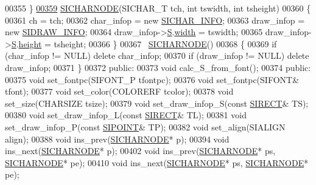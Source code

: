 \begin{DoxyCode}
00355     \}
\hyperlink{class_s_i_c_h_a_r_n_o_d_e_aa06366dc16bf0aab9d16aaf43be0f8a3}{00359}     \hyperlink{class_s_i_c_h_a_r_n_o_d_e_aa06366dc16bf0aab9d16aaf43be0f8a3}{SICHARNODE}(SICHAR\_T tch, \textcolor{keywordtype}{int} tswidth, \textcolor{keywordtype}{int} tsheight)   
00360     \{
00361         ch = tch;
00362         char\_infop = \textcolor{keyword}{new} \hyperlink{class_s_i_c_h_a_r___i_n_f_o}{SICHAR\_INFO};
00363         draw\_infop = \textcolor{keyword}{new} \hyperlink{class_s_i_d_r_a_w___i_n_f_o}{SIDRAW\_INFO};
00364         draw\_infop->\hyperlink{class_s_i_d_r_a_w___i_n_f_o_a495fac5bcc54e4b58d500a7117fde9d9}{S}.\hyperlink{struct_s_i_r_e_c_t_a99dbd77d045cc587f0c1f40bbba99ac8}{width} = tswidth;
00365         draw\_infop->\hyperlink{class_s_i_d_r_a_w___i_n_f_o_a495fac5bcc54e4b58d500a7117fde9d9}{S}.\hyperlink{struct_s_i_r_e_c_t_a6577f3092897d4bef17aab5ec4d62819}{height} = tsheight;
00366     \}
00367     ~\hyperlink{class_s_i_c_h_a_r_n_o_d_e}{SICHARNODE}() 
00368     \{
00369         \textcolor{keywordflow}{if} (char\_infop != NULL) \textcolor{keyword}{delete} char\_infop;
00370         \textcolor{keywordflow}{if} (draw\_infop != NULL) \textcolor{keyword}{delete} draw\_infop;
00371     \}
00372 \textcolor{keyword}{public}:
00373     \textcolor{keywordtype}{void} calc\_S\_from\_font();
00374 \textcolor{keyword}{public}:
00375     \textcolor{keywordtype}{void} set\_fontpc(SIFONT\_P tfontpc);  
00376     \textcolor{keywordtype}{void} set\_fontpc(SIFONT& tfont);
00377     \textcolor{keywordtype}{void} set\_color(COLORERF tcolor);
00378     \textcolor{keywordtype}{void} set\_size(CHARSIZE tsize);
00379     \textcolor{keywordtype}{void} set\_draw\_infop\_S(\textcolor{keyword}{const} \hyperlink{struct_s_i_r_e_c_t}{SIRECT}& TS);
00380     \textcolor{keywordtype}{void} set\_draw\_infop\_L(\textcolor{keyword}{const} \hyperlink{struct_s_i_r_e_c_t}{SIRECT}& TL);
00381     \textcolor{keywordtype}{void} set\_draw\_infop\_P(\textcolor{keyword}{const} \hyperlink{struct_s_i_p_o_i_n_t}{SIPOINT}& TP);
00382     \textcolor{keywordtype}{void} set\_align(SIALIGN align);
00388     \textcolor{keywordtype}{void} ins\_prev(\hyperlink{class_s_i_c_h_a_r_n_o_d_e}{SICHARNODE}* p);
00394     \textcolor{keywordtype}{void} ins\_next(\hyperlink{class_s_i_c_h_a_r_n_o_d_e}{SICHARNODE}* p);
00402     \textcolor{keywordtype}{void} ins\_prev(\hyperlink{class_s_i_c_h_a_r_n_o_d_e}{SICHARNODE}* ps, \hyperlink{class_s_i_c_h_a_r_n_o_d_e}{SICHARNODE}* pe);
00410     \textcolor{keywordtype}{void} ins\_next(\hyperlink{class_s_i_c_h_a_r_n_o_d_e}{SICHARNODE}* ps, \hyperlink{class_s_i_c_h_a_r_n_o_d_e}{SICHARNODE}* pe);

\end{DoxyCode}
